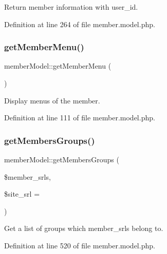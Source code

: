 Return member information with user\+\_\+id. 



Definition at line 264 of file member.\+model.\+php.

\hypertarget{classmemberModel_acd26b1539d27466b84d16d2be10f82cd}{}\label{classmemberModel_acd26b1539d27466b84d16d2be10f82cd} 
\subsubsection{\texorpdfstring{get\+Member\+Menu()}{getMemberMenu()}}
{\footnotesize\ttfamily member\+Model\+::get\+Member\+Menu (\begin{DoxyParamCaption}{ }\end{DoxyParamCaption})}



Display menus of the member. 



Definition at line 111 of file member.\+model.\+php.

\hypertarget{classmemberModel_ab7df778ac5ecbd62a6901a9c9764ff4f}{}\label{classmemberModel_ab7df778ac5ecbd62a6901a9c9764ff4f} 
\subsubsection{\texorpdfstring{get\+Members\+Groups()}{getMembersGroups()}}
{\footnotesize\ttfamily member\+Model\+::get\+Members\+Groups (\begin{DoxyParamCaption}\item[{}]{\$member\+\_\+srls,  }\item[{}]{\$site\+\_\+srl = {} }\end{DoxyParamCaption})}



Get a list of groups which member\+\_\+srls belong to. 



Definition at line 520 of file member.\+model.\+php.

\hypertarget{classmemberModel_ab93bf81cb81a354594dcedea50559ce2}{}\label{classmemberModel_ab93bf81cb81a354594dcedea50559ce2} 
